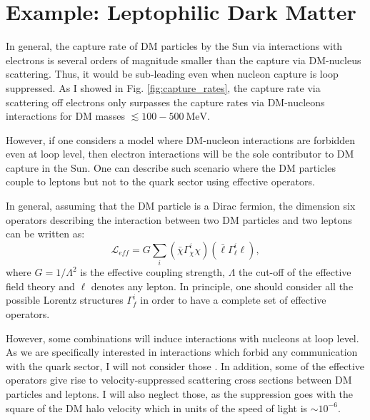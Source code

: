 \section{Example: Leptophilic Dark Matter}
\label{sec:dm_analysis_leptophilic_dm}

In general, the capture rate of DM particles by the Sun via interactions with electrons is several orders of magnitude smaller than the capture via DM-nucleus scattering. Thus, it would be sub-leading even when nucleon capture is loop suppressed. As I showed in Fig. \ref{fig:capture_rates}, the capture rate via scattering off electrons only surpasses the capture rates via DM-nucleons interactions for DM masses $\lesssim 100 - 500 \ \mathrm{MeV}$.

However, if one considers a model where DM-nucleon interactions are forbidden even at loop level, then electron interactions will be the sole contributor to DM capture in the Sun. One can describe such scenario where the DM particles couple to leptons but not to the quark sector using effective operators.

In general, assuming that the DM particle is a Dirac fermion, the dimension six operators describing the interaction between two DM particles and two leptons can be written as:
\begin{equation}\label{7.1}
	\mathcal{L}_{eff} = G \sum_{i} \left(\bar{\chi} \Gamma^{i}_{\chi} \chi\right)\left(\bar{\ell} \Gamma^{i}_{\ell} \ell\right),
\end{equation}
where $G=1/\Lambda^{2}$ is the effective coupling strength, $\Lambda$ the cut-off of the effective field theory and $\ell$ denotes any lepton. In principle, one should consider all the possible Lorentz structures $\Gamma^{i}_{f}$ in order to have a complete set of effective operators.

However, some combinations will induce interactions with nucleons at loop level. As we are specifically interested in interactions which forbid any communication with the quark sector, I will not consider those \cite{Kopp2009}. In addition, some of the effective operators give rise to velocity-suppressed scattering cross sections between DM particles and leptons. I will also neglect those, as the suppression goes with the square of the DM halo velocity which in units of the speed of light is $\sim 10^{-6}$.

